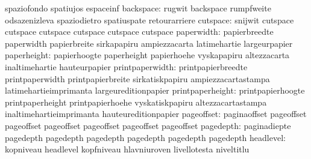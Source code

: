                                   spaziofondo                      spatiujos
                                  espaceinf
                       backspace: rugwit                           backspace
                                  rumpfweite                       odsazenizleva
                                  spaziodietro                     spatiuspate
                                  retourarriere
                        cutspace: snijwit                          cutspace
                                  cutspace                         cutspace
                                  cutspace                         cutspace
                                  cutspace
                      paperwidth: papierbreedte                    paperwidth
                                  papierbreite                     sirkapapiru
                                  ampiezzacarta                    latimehartie
                                  largeurpapier
                     paperheight: papierhoogte                     paperheight
                                  papierhoehe                      vyskapapiru
                                  altezzacarta                     inaltimehartie
                                  hauteurpapier
                 printpaperwidth: printpapierbreedte               printpaperwidth
                                  printpapierbreite                sirkatiskpapiru
                                  ampiezzacartastampa              latimehartieimprimanta
                                  largeureditionpapier
                printpaperheight: printpapierhoogte                printpaperheight
                                  printpapierhoehe                 vyskatiskpapiru
                                  altezzacartastampa               inaltimehartieimprimanta
                                  hauteureditionpapier
                      pageoffset: paginaoffset                     pageoffset
                                  pageoffset                       pageoffset
                                  pageoffset                       pageoffset
                                  pageoffset
                       pagedepth: paginadiepte                     pagedepth
                                  pagedepth                        pagedepth
                                  pagedepth                        pagedepth
                                  pagedepth
                       headlevel: kopniveau                        headlevel
                                  kopfniveau                       hlavniuroven
                                  livellotesta                     niveltitlu
